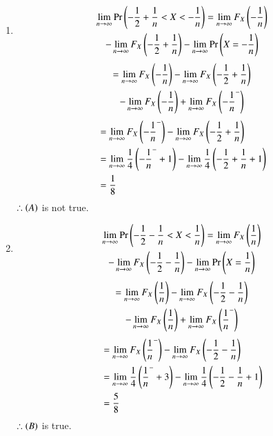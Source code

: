 \documentclass[journal,12pt,twocolumn]{IEEEtran}
\theoremstyle{remark}
\begin{document}
\solution
\begin{enumerate}[label=(\Alph*)]
    \item \begin{multline} 
    		\lim_{n \to \infty} \Pr\left(-\frac{1}{2} + \frac{1}{n} < X < -\frac{1}{n}\right) = \lim_{n \to \infty}F_X\left(-\frac{1}{n}\right)  \\ -\lim_{n \to \infty}F_X\left(-\frac{1}{2} + \frac{1}{n}\right) - \lim_{n \to \infty}\Pr\left(X=-\frac{1}{n}\right)
	\end{multline}
    	\begin{multline}
    		= \lim_{n \to \infty}F_X\left(-\frac{1}{n}\right) - \lim_{n \to \infty}F_X\left(-\frac{1}{2} + \frac{1}{n}\right)  \\ -\lim_{n \to \infty}F_X\left(-\frac{1}{n}\right) + \lim_{n \to \infty}F_X\left(-\frac{1}{n}^-\right)
	\end{multline}
    	\begin{align}
    		&= \lim_{n \to \infty} F_X\left(-\frac{1}{n}^-\right) - \lim_{n \to \infty}F_X\left(-\frac{1}{2} + \frac{1}{n}\right)\\
    	&= \lim_{n \to \infty}\frac{1}{4}\left(-\frac{1}{n}^-+1\right)-\lim_{n \to \infty}\frac{1}{4}\left(-\frac{1}{2} + \frac{1}{n}+1\right)\\
    	&= \frac{1}{8}
    	\end{align}
    	$\therefore \left(A\right)$ is not true.
    	
    \item \begin{multline} 
    		\lim_{n \to \infty} \Pr\left(-\frac{1}{2} - \frac{1}{n} < X < \frac{1}{n}\right) = \lim_{n \to \infty}F_X\left(\frac{1}{n}\right)  \\ -\lim_{n \to \infty}F_X\left(-\frac{1}{2} - \frac{1}{n}\right) - \lim_{n \to \infty}\Pr\left(X=\frac{1}{n}\right)
	\end{multline}
	\begin{multline}
    		= \lim_{n \to \infty}F_X\left(\frac{1}{n}\right) - \lim_{n \to \infty}F_X\left(-\frac{1}{2} - \frac{1}{n}\right)  \\ -\lim_{n \to \infty}F_X\left(\frac{1}{n}\right) + \lim_{n \to \infty}F_X\left(\frac{1}{n}^-\right)
	\end{multline}
	\begin{align}
    		&= \lim_{n \to \infty} F_X\left(\frac{1}{n}^-\right) - \lim_{n \to \infty}F_X\left(-\frac{1}{2} - \frac{1}{n}\right)\\
    	&= \lim_{n \to \infty}\frac{1}{4}\left(\frac{1}{n}^-+3\right)-\lim_{n \to \infty}\frac{1}{4}\left(-\frac{1}{2} - \frac{1}{n}+1\right)\\
    	&= \frac{5}{8}
    	\end{align}
    	$\therefore \left(B\right)$ is true.
    	

\end{enumerate}
\end{document}
